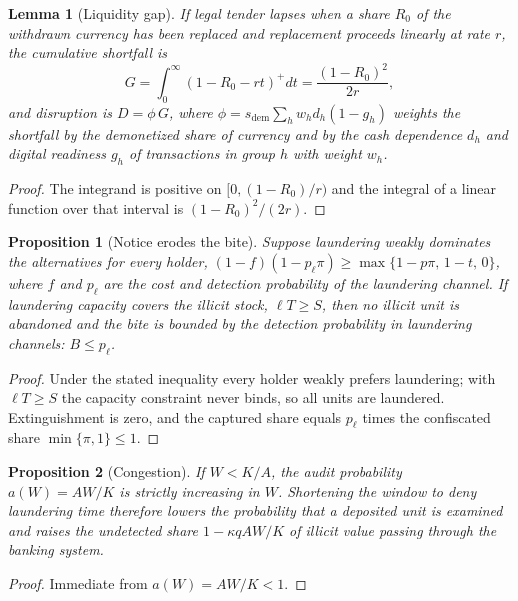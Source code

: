 \documentclass[11pt]{article}
\newtheorem{proposition}{Proposition}
\newtheorem{lemma}{Lemma}
\theoremstyle{definition}
\theoremstyle{remark}
\begin{document}
\begin{lemma}[Liquidity gap]\label{lem:gap} If legal tender lapses when a share $R_0$ of the withdrawn currency has been
replaced and replacement proceeds linearly at rate $r$, the cumulative shortfall is
\begin{equation}
G=\int_0^\infty\left(1-R_0-rt\right)^{+}dt=\frac{(1-R_0)^2}{2r},
\end{equation}
and disruption is $D=\phi\,G$, where $\phi=s_{\mathrm{dem}}\sum_h w_h d_h(1-g_h)$ weights the shortfall by the
demonetized share of currency and by the cash dependence $d_h$ and digital readiness $g_h$ of transactions in group $h$
with weight $w_h$.\end{lemma}
\begin{proof} The integrand is positive on $[0,(1-R_0)/r)$ and the integral of a linear function over that interval is
$(1-R_0)^2/(2r)$.\end{proof}

\begin{proposition}[Notice erodes the bite]\label{prop:notice} Suppose laundering weakly dominates the alternatives for
every holder, $(1-f)(1-p_\ell\pi)\ge\max\{1-p\pi,\,1-t,\,0\}$, where $f$ and $p_\ell$ are the cost and detection
probability of the laundering channel. If laundering capacity covers the illicit stock, $\ell T\ge S$, then no illicit unit
is abandoned and the bite is bounded by the detection probability in laundering channels: $B\le p_\ell$.\end{proposition}
\begin{proof} Under the stated inequality every holder weakly prefers laundering; with $\ell T\ge S$ the capacity
constraint never binds, so all units are laundered. Extinguishment is zero, and the captured share equals $p_\ell$ times
the confiscated share $\min\{\pi,1\}\le 1$.\end{proof}

\begin{proposition}[Congestion]\label{prop:congestion} If $W<K/A$, the audit probability $a(W)=AW/K$ is strictly
increasing in $W$. Shortening the window to deny laundering time therefore lowers the probability that a deposited unit is
examined and raises the undetected share $1-\kappa qAW/K$ of illicit value passing through the banking system.\end{proposition}
\begin{proof} Immediate from $a(W)=AW/K<1$.\end{proof}
\end{document}
